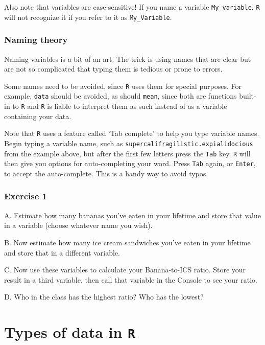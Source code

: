 \documentclass[
]{book}
\begin{document}
Also note that variables are case-sensitive! If you name a variable \texttt{My\_variable}, \texttt{R} will not recognize it if you refer to it as \texttt{My\_Variable}.

\hypertarget{naming-theory}{%
\subsubsection*{Naming theory}\label{naming-theory}}

Naming variables is a bit of an art. The trick is using names that are clear but are not so complicated that typing them is tedious or prone to errors.

Some names need to be avoided, since \texttt{R} uses them for special purposes. For example, \texttt{data} should be avoided, as should \texttt{mean}, since both are functions built-in to \texttt{R} and \texttt{R} is liable to interpret them as such instead of as a variable containing your data.

Note that \texttt{R} uses a feature called `Tab complete' to help you type variable names. Begin typing a variable name, such as \texttt{supercalifragilistic.expialidocious} from the example above, but after the first few letters press the \texttt{Tab} key. \texttt{R} will then give you options for auto-completing your word. Press \texttt{Tab} again, or \texttt{Enter}, to accept the auto-complete. This is a handy way to avoid typos.

\hypertarget{exercise-1-2}{%
\subsubsection*{Exercise 1}\label{exercise-1-2}}

A. Estimate how many bananas you've eaten in your lifetime and store that value in a variable (choose whatever name you wish).

B. Now estimate how many ice cream sandwiches you've eaten in your lifetime and store that in a different variable.

C. Now use these variables to calculate your Banana-to-ICS ratio. Store your result in a third variable, then call that variable in the Console to see your ratio.

D. Who in the class has the highest ratio? Who has the lowest?

\hypertarget{types-of-data-in-r}{%
\section*{\texorpdfstring{Types of data in \texttt{R}}{Types of data in R}}\label{types-of-data-in-r}}
\end{document}
